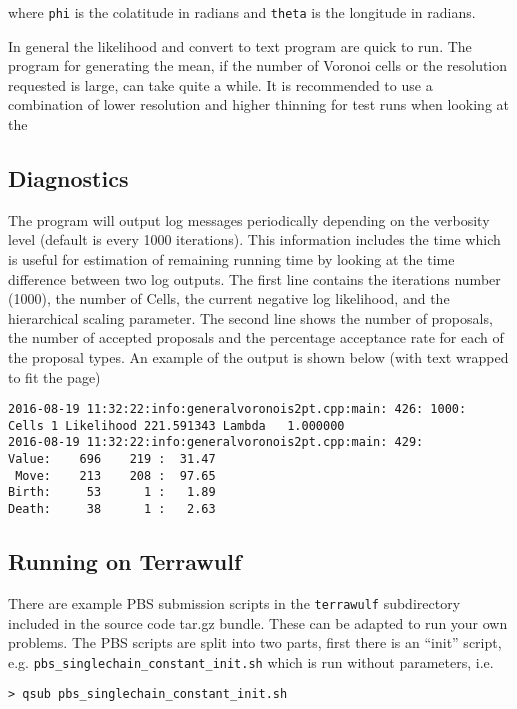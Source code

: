 \documentclass{article}
\begin{document}
where {\tt phi} is the colatitude in radians and {\tt theta} is the longitude in radians.

In general the likelihood and convert to text program are quick to run. The program for
generating the mean, if the number of Voronoi cells or the resolution requested is large,
can take quite a while. It is recommended to use a combination of lower resolution and
higher thinning for test runs when looking at the 

\subsection{Diagnostics}

The program will output log messages periodically depending on the verbosity level (default is
every 1000 iterations). This information includes the time which is useful for estimation of
remaining running time by looking at the time difference between two log outputs.
The first line contains the iterations number (1000), the number of Cells, the current negative log likelihood,
and the hierarchical scaling parameter. The second line shows the number of proposals, the number of
accepted proposals and the percentage acceptance rate for each of the proposal types. An example of
the output is shown below (with text wrapped to fit the page)

\begin{verbatim}
2016-08-19 11:32:22:info:generalvoronois2pt.cpp:main: 426: 1000: 
Cells 1 Likelihood 221.591343 Lambda   1.000000
2016-08-19 11:32:22:info:generalvoronois2pt.cpp:main: 429:         
Value:    696    219 :  31.47
 Move:    213    208 :  97.65
Birth:     53      1 :   1.89
Death:     38      1 :   2.63
\end{verbatim}


\subsection{Running on Terrawulf}

There are example PBS submission scripts in the {\tt terrawulf} subdirectory
included in the source code tar.gz bundle. These can be adapted to run your own
problems. The PBS scripts are split into two parts, first there is an ``init''
script, e.g. {\tt pbs\_singlechain\_constant\_init.sh} which is run without
parameters, i.e.

\begin{verbatim}
> qsub pbs_singlechain_constant_init.sh 
\end{verbatim}
\end{document}
